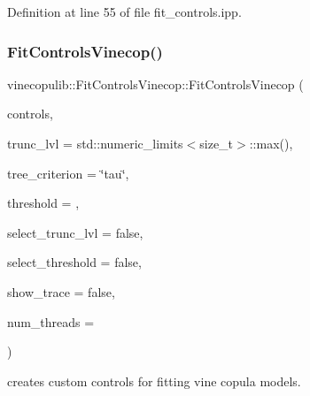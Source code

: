 Definition at line 55 of file fit\+\_\+controls.\+ipp.

\mbox{\label{classvinecopulib_1_1_fit_controls_vinecop_a22cb78b491409cb9ce6e8a17dc21e7b8}} 
\subsubsection{\texorpdfstring{Fit\+Controls\+Vinecop()}{FitControlsVinecop()}\hspace{0.1cm}{\footnotesize\ttfamily [2/2]}}
{\footnotesize\ttfamily vinecopulib\+::\+Fit\+Controls\+Vinecop\+::\+Fit\+Controls\+Vinecop (\begin{DoxyParamCaption}\item[{const \hyperlink{classvinecopulib_1_1_fit_controls_bicop}{Fit\+Controls\+Bicop} \&}]{controls,  }\item[{size\+\_\+t}]{trunc\+\_\+lvl = {\ttfamily std\+:\+:numeric\+\_\+limits$<$size\+\_\+t$>$\+:\+:max()},  }\item[{std\+::string}]{tree\+\_\+criterion = {\ttfamily \char`\"{}tau\char`\"{}},  }\item[{double}]{threshold = {},  }\item[{bool}]{select\+\_\+trunc\+\_\+lvl = {\ttfamily false},  }\item[{bool}]{select\+\_\+threshold = {\ttfamily false},  }\item[{bool}]{show\+\_\+trace = {\ttfamily false},  }\item[{size\+\_\+t}]{num\+\_\+threads = {} }\end{DoxyParamCaption})\hspace{0.3cm}{\ttfamily [inline]}}



creates custom controls for fitting vine copula models. 


